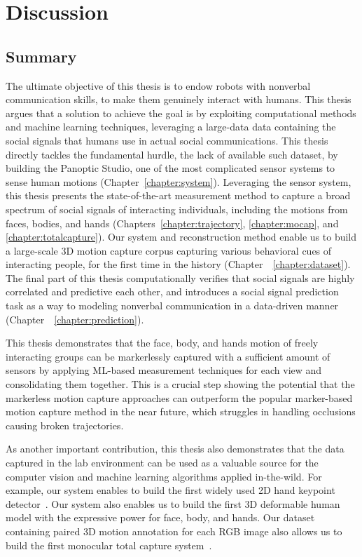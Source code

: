 \chapter{Discussion}
\label{chapter:discussion}

\section{Summary}
The ultimate objective of this thesis is to endow robots with nonverbal communication skills, to make them genuinely interact with humans. This thesis argues that a solution to achieve the goal is by exploiting computational methods and machine learning techniques, leveraging a large-data data containing the social signals that humans use in actual social communications. This thesis directly tackles the fundamental hurdle, the lack of available such dataset, by building the Panoptic Studio, one of the most complicated sensor systems to sense human motions (Chapter~\ref{chapter:system}). Leveraging the sensor system, this thesis presents the state-of-the-art measurement method to capture a broad spectrum of social signals of interacting individuals, including the motions from faces, bodies, and hands (Chapters~\ref{chapter:trajectory}, \ref{chapter:mocap}, and  \ref{chapter:totalcapture}). Our system and reconstruction method enable us to build a large-scale 3D motion capture corpus capturing various behavioral cues of interacting people, for the first time in the history (Chapter~~\ref{chapter:dataset}). The final part of this thesis computationally verifies that social signals are highly correlated and predictive each other, and introduces a social signal prediction task as a way to modeling nonverbal communication in a data-driven manner (Chapter~~\ref{chapter:prediction}).

This thesis demonstrates that the face, body, and hands motion of freely interacting groups can be markerlessly captured with a sufficient amount of sensors by applying ML-based measurement techniques for each view and consolidating them together. This is a crucial step showing the potential that the markerless motion capture approaches can outperform the popular marker-based motion capture method in the near future, which struggles in handling occlusions causing broken trajectories. 

As another important contribution, this thesis also demonstrates that the data captured in the lab environment can be used as a valuable source for the computer vision and machine learning algorithms applied in-the-wild. For example, our system enables to build the first widely used 2D hand keypoint detector~\cite{simon2017hand}. Our system also enables us to build the first 3D deformable human model with the expressive power for face, body, and hands.  Our dataset containing paired 3D motion annotation for each RGB image also allows us to build the first monocular total capture system~\cite{Xiang2019}. 


